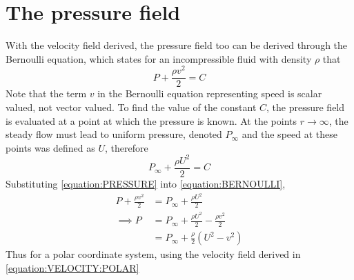 \section{The pressure field}
With the velocity field derived, the pressure field too can be derived through the Bernoulli equation,
which states for an incompressible fluid with density $\rho$ that
\begin{equation}\label{equation:BERNOULLI}
    P+\frac{\rho v^2}{2}=C
\end{equation}
Note that the term $v$ in the Bernoulli equation representing speed is scalar valued, not vector valued.
To find the value of the constant $C$, the pressure field is evaluated at a point at which the pressure
is known. At the points $r\rightarrow\infty$, the steady flow must lead to uniform pressure, denoted
$P_\infty$ and the speed at these points was defined as $U$,
therefore
\begin{equation}\label{equation:PRESSURE}
    P_\infty+\frac{\rho U^2}{2}=C
\end{equation}
Substituting \eqref{equation:PRESSURE} into \eqref{equation:BERNOULLI},
\begin{align*}
    P+\frac{\rho v^2}{2}&=P_\infty+\frac{\rho U^2}{2}\\
    \implies P&=P_\infty+\frac{\rho U^2}{2}-\frac{\rho v^2}{2}\\
    &=P_\infty+\frac{\rho}{2}\left(U^2-v^2\right)
\end{align*}
Thus for a polar coordinate system, using the velocity field derived in \eqref{equation:VELOCITY:POLAR}
